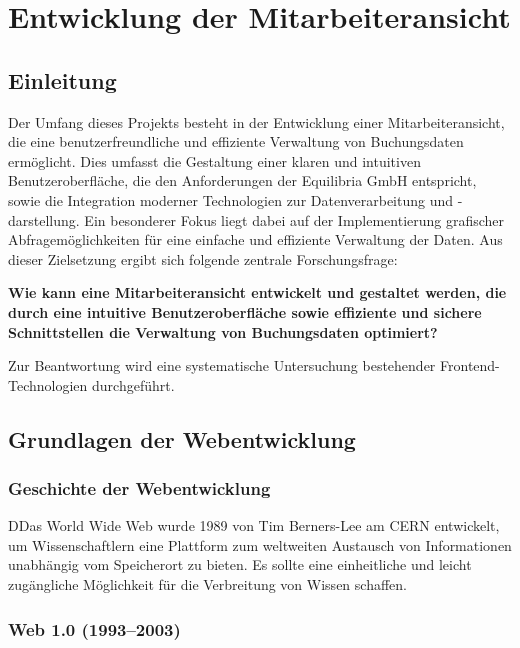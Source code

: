\section{Entwicklung der Mitarbeiteransicht}

\subsection{Einleitung}

Der Umfang dieses Projekts besteht in der Entwicklung einer Mitarbeiteransicht, die eine benutzerfreundliche und effiziente Verwaltung von Buchungsdaten ermöglicht. Dies umfasst die Gestaltung einer klaren und intuitiven Benutzeroberfläche, die den Anforderungen der Equilibria GmbH entspricht, sowie die Integration moderner Technologien zur Datenverarbeitung und -darstellung. Ein besonderer Fokus liegt dabei auf der Implementierung grafischer Abfragemöglichkeiten für eine einfache und effiziente Verwaltung der Daten. Aus dieser Zielsetzung ergibt sich folgende zentrale Forschungsfrage:
\newline

\begin{center}
	
	\textbf{{Wie kann eine Mitarbeiteransicht entwickelt und gestaltet werden, die durch eine intuitive Benutzeroberfläche sowie effiziente und sichere Schnittstellen die Verwaltung von Buchungsdaten optimiert?}}
    
\end{center}

Zur Beantwortung wird eine systematische Untersuchung bestehender Frontend-Technologien durchgeführt.

\subsection{Grundlagen der Webentwicklung}

\subsubsection{Geschichte der Webentwicklung}
DDas World Wide Web wurde 1989 von Tim Berners-Lee am CERN entwickelt, um Wissenschaftlern eine Plattform zum weltweiten Austausch von Informationen unabhängig vom Speicherort zu bieten. Es sollte eine einheitliche und leicht zugängliche Möglichkeit für die Verbreitung von Wissen schaffen.\textit{\cite{cern_birth_web}}

\subsubsection{Web 1.0 (1993–2003)}

